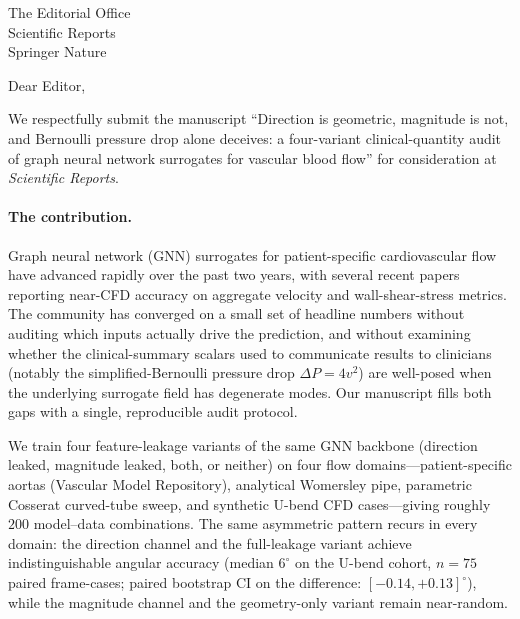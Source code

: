 \documentclass[11pt,a4paper]{letter}
\begin{document}
\begin{letter}{The Editorial Office\\
Scientific Reports\\
Springer Nature}

\opening{Dear Editor,}

We respectfully submit the manuscript ``Direction is geometric,
magnitude is not, and Bernoulli pressure drop alone deceives: a
four-variant clinical-quantity audit of graph neural network
surrogates for vascular blood flow'' for consideration at
\textit{Scientific Reports}.

\paragraph{The contribution.}
Graph neural network (GNN) surrogates for patient-specific
cardiovascular flow have advanced rapidly over the past two years,
with several recent papers reporting near-CFD accuracy on aggregate
velocity and wall-shear-stress metrics. The community has converged
on a small set of headline numbers without auditing which inputs
actually drive the prediction, and without examining whether the
clinical-summary scalars used to communicate results to clinicians
(notably the simplified-Bernoulli pressure drop $\Delta P = 4 v^2$)
are well-posed when the underlying surrogate field has degenerate
modes. Our manuscript fills both gaps with a single, reproducible
audit protocol.

We train four feature-leakage variants of the same GNN backbone
(direction leaked, magnitude leaked, both, or neither) on four flow
domains---patient-specific aortas (Vascular Model Repository),
analytical Womersley pipe, parametric Cosserat curved-tube sweep,
and synthetic U-bend CFD cases---giving roughly $200$ model--data
combinations. The same asymmetric pattern recurs in every domain:
the direction channel and the full-leakage variant achieve
indistinguishable angular accuracy (median $6^\circ$ on the U-bend
cohort, $n=75$ paired frame-cases; paired bootstrap CI on the
difference: $[-0.14, +0.13]^\circ$), while the magnitude channel
and the geometry-only variant remain near-random.


\end{letter}
\end{document}
